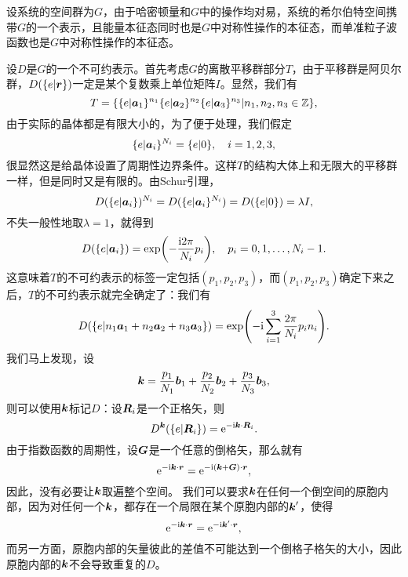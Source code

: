 设系统的空间群为$G$，由于哈密顿量和$G$中的操作均对易，系统的希尔伯特空间携带$G$的一个表示，且能量本征态同时也是$G$中对称性操作的本征态，而单准粒子波函数也是$G$中对称性操作的本征态。

设$D$是$G$的一个不可约表示。首先考虑$G$的离散平移群部分$T$，由于平移群是阿贝尔群，$D(\{ e | \vb*{r}\})$一定是某个复数乘上单位矩阵$I$。显然，我们有
\begin{equation}
    T = \{ \{e | \vb*{a}_1\}^{n_1} \{e | \vb*{a}_2\}^{n_2} \{e | \vb*{a}_3\}^{n_3} | n_1, n_2, n_3 \in \mathbb{Z} \},
\end{equation}
由于实际的晶体都是有限大小的，为了便于处理，我们假定
\begin{equation}
    \{e | \vb*{a}_i\}^{N_i} = \{e | 0\}, \quad i = 1, 2, 3,
\end{equation}
很显然这是给晶体设置了周期性边界条件。这样$T$的结构大体上和无限大的平移群一样，但是同时又是有限的。由Schur引理，
\[
    D(\{e | \vb*{a}_i \})^{N_i} = D(\{e | \vb*{a}_i \}^{N_i}) = D(\{e | 0\}) = \lambda I,
\]
不失一般性地取$\lambda = 1$，就得到
\begin{equation}
    D(\{e | \vb*{a}_i\}) = \exp(- \frac{\mathrm{i} 2 \pi}{N_i} p_i), \quad p_i = 0, 1, \ldots, N_i - 1.
\end{equation}
这意味着$T$的不可约表示的标签一定包括$(p_1, p_2, p_3)$，而$(p_1, p_2, p_3)$确定下来之后，$T$的不可约表示就完全确定了：我们有
\begin{equation}
    D(\{e | n_1 \vb*{a}_1 + n_2 \vb*{a}_2 + n_3 \vb*{a}_3\}) = \exp(- \mathrm{i} \sum_{i=1}^3 \frac{2\pi}{N_i} p_i n_i ).
\end{equation}
我们马上发现，设
\begin{equation}
    \vb*{k} = \frac{p_1}{N_1} \vb*{b}_1 + \frac{p_2}{N_2} \vb*{b}_2 + \frac{p_3}{N_3} \vb*{b}_3,
\end{equation}
则可以使用$\vb*{k}$标记$D$：设$\vb*{R}_i$是一个正格矢，则
\begin{equation}
    D^{\vb*{k}}(\{e | \vb*{R}_i \}) = \mathrm{e}^{- \mathrm{i} \vb*{k} \cdot \vb*{R}_i}.
\end{equation}
由于指数函数的周期性，设$\vb*{G}$是一个任意的倒格矢，那么就有
\[
    \mathrm{e}^{- \mathrm{i} \vb*{k} \cdot \vb*{r}} = \mathrm{e}^{- \mathrm{i} (\vb*{k} + \vb*{G}) \cdot \vb*{r}},
\]
因此，没有必要让$\vb*{k}$取遍整个空间。
我们可以要求$\vb*{k}$在任何一个倒空间的原胞内部，因为对任何一个$\vb*{k}$，都存在一个局限在某个原胞内部的$\vb*{k}'$，使得
\[
    \mathrm{e}^{- \mathrm{i} \vb*{k} \cdot \vb*{r}} = \mathrm{e}^{- \mathrm{i} \vb*{k}' \cdot \vb*{r}},
\]
而另一方面，原胞内部的矢量彼此的差值不可能达到一个倒格子格矢的大小，因此原胞内部的$\vb*{k}$不会导致重复的$D$。

